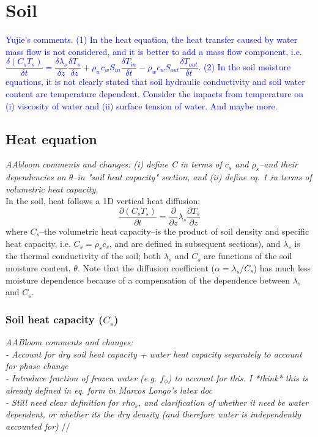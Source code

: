 \documentclass{article}
\begin{document}
\vfill
\clearpage

\section{Soil}

\textcolor{blue}{Yujie's comments. (1) In the heat equation, the heat transfer caused by water mass flow is not considered, and it is better to add a mass flow component, i.e. $\dfrac{\delta (C_s T_s)}{\delta t} = \dfrac{\delta \lambda_s}{\delta z} \dfrac{\delta T_s}{\delta z} + \rho_w c_w S_{in} \dfrac{\delta T_{in}}{\delta t} - \rho_w c_w S_{out} \dfrac{\delta T_{out}}{\delta t}$. (2) In the soil moisture equations, it is not clearly stated that soil hydraulic conductivity and soil water content are temperature dependent. Consider the impacts from temperature on (i) viscosity of water and (ii) surface tension of water. And maybe more.}

\subsection{Heat equation}

\textit{AAbloom comments and changes:  (i) define C in terms of $c_s$ and $\rho_s$--and their dependencies on $\theta$--in "soil heat capacity" section, and (ii) define eq. 1 in terms of volumetric heat capacity.}
\\

In the soil, heat follows a 1D vertical heat diffusion:
\begin{equation}
     \frac{\partial (C_s T_s) }{\partial t} = \frac{\partial }{\partial z}\lambda_s \frac{\partial T_s }{\partial z}
\end{equation}
where $C_s$--the volumetric heat capacity--is the product of soil density and specific heat capacity, i.e.  $C_s = \rho_s c_s$, and are defined in subsequent sections), and $\lambda_{s}$ is the thermal conductivity of the soil; both $\lambda_{s}$ and $C_s$ are functions of the soil moisture content, $\theta$. Note that the diffusion coefficient ($\alpha = \lambda_s/C_s$) has much less moisture dependence because of a compensation of the dependence between $\lambda_s$ and $C_s$.

\subsubsection{Soil heat capacity ($C_s$)}

\textit{AABloom comments and changes: 
\\
- Account for dry soil heat capacity + water heat capacity separately to account for phase change
\\
- Introduce fraction of frozen water (e.g. $f_\phi$) to account for this. I *think* this is already defined in eq. form in Marcos Longo's latex doc
\\
- Still need clear definition for $rho_s$, and clarification of whether it need be water dependent, or whether its the dry density (and therefore water is independently accounted for)}
//
\end{document}
